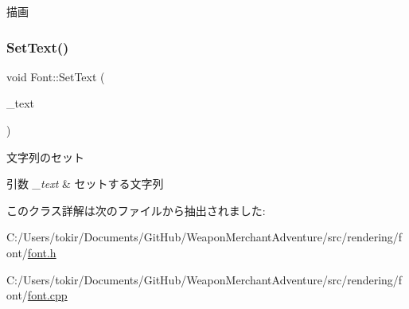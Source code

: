 描画 

\mbox{\label{class_font_a2c862120802e9aac650a96f7b4e29081}} 
\subsubsection{\texorpdfstring{Set\+Text()}{SetText()}}
{\footnotesize\ttfamily void Font\+::\+Set\+Text (\begin{DoxyParamCaption}\item[{W\+C\+H\+AR $\ast$}]{\+\_\+text }\end{DoxyParamCaption})\hspace{0.3cm}{\ttfamily [inline]}}



文字列のセット 


\begin{DoxyParams}{引数}
{\em \+\_\+text} & セットする文字列 \\
\hline
\end{DoxyParams}


このクラス詳解は次のファイルから抽出されました\+:\begin{DoxyCompactItemize}
\item 
C\+:/\+Users/tokir/\+Documents/\+Git\+Hub/\+Weapon\+Merchant\+Adventure/src/rendering/font/\mbox{\hyperlink{font_8h}{font.\+h}}\item 
C\+:/\+Users/tokir/\+Documents/\+Git\+Hub/\+Weapon\+Merchant\+Adventure/src/rendering/font/\mbox{\hyperlink{font_8cpp}{font.\+cpp}}\end{DoxyCompactItemize}
